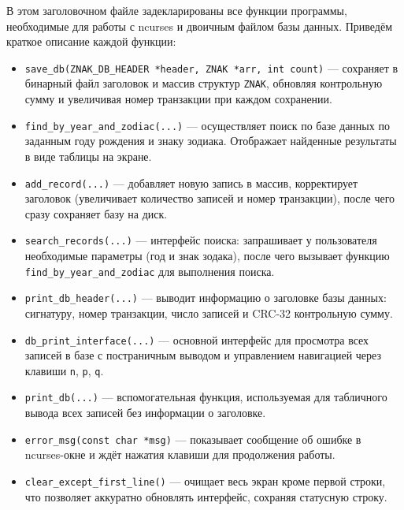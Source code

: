 \noindent
В этом заголовочном файле задекларированы все функции программы, необходимые для работы с ncurses и двоичным файлом базы данных. Приведём краткое описание каждой функции:
\begin{itemize}
  \item \texttt{save\_db(ZNAK\_DB\_HEADER *header, ZNAK *arr, int count)} — сохраняет в бинарный файл заголовок и массив структур \texttt{ZNAK}, обновляя контрольную сумму и увеличивая номер транзакции при каждом сохранении.
  
  \item \texttt{find\_by\_year\_and\_zodiac(...)} — осуществляет поиск по базе данных по заданным году рождения и знаку зодиака. Отображает найденные результаты в виде таблицы на экране.
  
  \item \texttt{add\_record(...)} — добавляет новую запись в массив, корректирует заголовок (увеличивает количество записей и номер транзакции), после чего сразу сохраняет базу на диск.
  
  \item \texttt{search\_records(...)} — интерфейс поиска: запрашивает у пользователя необходимые параметры (год и знак зодака), после чего вызывает функцию \texttt{find\_by\_year\_and\_zodiac} для выполнения поиска.
  
  \item \texttt{print\_db\_header(...)} — выводит информацию о заголовке базы данных: сигнатуру, номер транзакции, число записей и CRC-32 контрольную сумму.
  
  \item \texttt{db\_print\_interface(...)} — основной интерфейс для просмотра всех записей в базе с постраничным выводом и управлением навигацией через клавиши \texttt{n}, \texttt{p}, \texttt{q}.
  
  \item \texttt{print\_db(...)} — вспомогательная функция, используемая для табличного вывода всех записей без информации о заголовке.
  
  \item \texttt{error\_msg(const char *msg)} — показывает сообщение об ошибке в ncurses-окне и ждёт нажатия клавиши для продолжения работы.
  
  \item \texttt{clear\_except\_first\_line()} — очищает весь экран кроме первой строки, что позволяет аккуратно обновлять интерфейс, сохраняя статусную строку.
\end{itemize}

